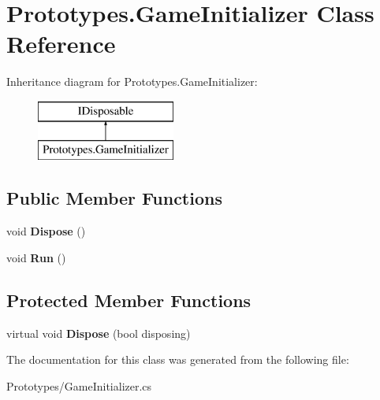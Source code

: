 \hypertarget{class_prototypes_1_1_game_initializer}{}\section{Prototypes.\+Game\+Initializer Class Reference}
\label{class_prototypes_1_1_game_initializer}
Inheritance diagram for Prototypes.\+Game\+Initializer\+:\begin{figure}[H]
\begin{center}
\leavevmode
\includegraphics[height=2.000000cm]{class_prototypes_1_1_game_initializer}
\end{center}
\end{figure}
\subsection*{Public Member Functions}
\begin{DoxyCompactItemize}
\item 
\mbox{\label{class_prototypes_1_1_game_initializer_a45b7ebf09b7c921d8d46b5897acd43be}} 
void {\bfseries Dispose} ()
\item 
\mbox{\label{class_prototypes_1_1_game_initializer_a1d2fce8fa17918343158ac216989c317}} 
void {\bfseries Run} ()
\end{DoxyCompactItemize}
\subsection*{Protected Member Functions}
\begin{DoxyCompactItemize}
\item 
\mbox{\label{class_prototypes_1_1_game_initializer_a04deb05c3040d705b68c4e3608f52b81}} 
virtual void {\bfseries Dispose} (bool disposing)
\end{DoxyCompactItemize}


The documentation for this class was generated from the following file\+:\begin{DoxyCompactItemize}
\item 
Prototypes/Game\+Initializer.\+cs\end{DoxyCompactItemize}
